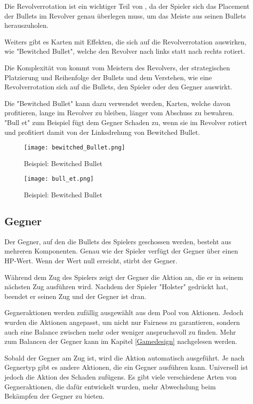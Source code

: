 Die Revolverrotation ist ein wichtiger Teil von \FF, da der Spieler sich das Placement der Bullets im Revolver genau überlegen muss,
um das Meiste aus seinen Bullets herauszuholen.


Weiters gibt es Karten mit Effekten, die sich auf die Revolverrotation auswirken, wie \zB "Bewitched Bullet",
welche den Revolver nach links statt nach rechts rotiert.


Die Komplexität von \FF kommt vom Meistern des Revolvers, der strategischen Platzierung und Reihenfolge der Bullets und dem Verstehen,
wie eine Revolverrotation sich auf die Bullets, den Spieler oder den Gegner auswirkt.


Die "Bewitched Bullet" kann \zB dazu verwendet werden, Karten,
welche davon profitieren, lange im Revolver zu bleiben, länger vom Abschuss zu bewahren. "Bull et" zum Beispiel fügt dem Gegner Schaden zu,
wenn sie im Revolver rotiert und profitiert damit von der Linksdrehung von Bewitched Bullet.


\begin{figure}[H]
    \centering
    \texttt{[image: bewitched\_Bullet.png]}
    \caption{Beispiel: Bewitched Bullet}
\end{figure}

\begin{figure}[H]
    \centering
    \texttt{[image: bull\_et.png]}
    \caption{Beispiel: Bewitched Bullet}
\end{figure}


\subsection{Gegner}\label{gegner}
Der Gegner, auf den die Bullets des Spielers geschossen werden, besteht aus mehreren Komponenten.
Genau wie der Spieler verfügt der Gegner über einen HP-Wert. Wenn der Wert null erreicht, stirbt der Gegner.


Während dem Zug des Spielers zeigt der Gegner die Aktion an, die er in seinem nächsten Zug ausführen wird.
Nachdem der Spieler "Holster" gedrückt hat, beendet er seinen Zug und der Gegner ist dran.

Gegneraktionen werden zufällig ausgewählt aus dem Pool von Aktionen.
Jedoch wurden die Aktionen angepasst, um nicht nur Fairness zu garantieren,
sondern auch eine Balance zwischen mehr oder weniger anspruchsvoll zu finden.
Mehr zum Balancen der Gegner kann im Kapitel \ref{Gamedesign} nachgelesen werden.


Sobald der Gegner am Zug ist, wird die Aktion automatisch ausgeführt. Je nach Gegnertyp gibt es andere Aktionen,
die ein Gegner ausführen kann. Universell ist jedoch die Aktion des Schaden zufügens.
Es gibt viele verschiedene Arten von Gegneraktionen, die dafür entwickelt wurden, mehr Abwechslung beim Bekämpfen der Gegner zu bieten.

